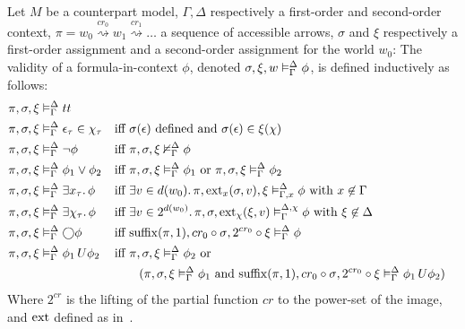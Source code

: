 \begin{definition}
Let $M$ be a counterpart model, $\Gamma,\Delta$ respectively a first-order and second-order context, $\pi = w_0
\overset{cr_0}{\rightsquigarrow} w_1 \overset{cr_1}{\rightsquigarrow} \ldots$ a sequence of accessible arrows,
$\sigma$ and $\xi$ respectively a first-order assignment and a second-order assignment for the world $w_0$:
The validity of a formula-in-context $\phi$, denoted ${\sigma}, {\xi}, {w} \vDash_{\Gamma}^{\Delta} {\phi}$, is defined
inductively as follows:
\begin{align*}
  \pi, \sigma, \xi &\vDash_\Gamma^\Delta tt \\
  \pi, \sigma, \xi &\vDash_\Gamma^\Delta \epsilon_\tau \in \chi_\tau
      &&\text{iff } \sigma(\epsilon) \text{ defined and } \sigma(\epsilon) \in \xi(\chi) \\
  \pi, \sigma, \xi &\vDash_\Gamma^\Delta \neg\phi
      &&\text{iff } {\pi}, {\sigma}, {\xi} \nvDash_{\Gamma}^{\Delta} {\phi} \\
  \pi, \sigma, \xi &\vDash_\Gamma^\Delta \phi_1 \lor \phi_2
      &&\text{iff } {\pi}, {\sigma}, {\xi} \vDash_{\Gamma}^{\Delta} {\phi_1} \text{ or }
      {\pi}, {\sigma}, {\xi} \vDash_{\Gamma}^{\Delta} {\phi_2} \\
  \pi, \sigma, \xi &\vDash_\Gamma^\Delta \exists {x_\tau} \ldotp {\phi}
      &&\text{iff } \exists {v \in d(w_0)} \ldotp {{\pi}, {\operatorname{ext}_{x}({\sigma},{v})}, {\xi} \vDash_{\Gamma, x}^{\Delta} {\phi}} \text{ with }
      x \not\in \Gamma \\
  \pi, \sigma, \xi &\vDash_\Gamma^\Delta \exists {\chi_\tau} \ldotp {\phi}
      &&\text{iff } \exists {v \in 2^{d(w_0)}} \ldotp {{\pi}, {\sigma}, {\operatorname{ext}_{\chi}({\xi},{v})} \vDash_{\Gamma}^{\Delta,\chi} {\phi}}
        \text{ with } \xi \not\in \Delta \\
  \pi, \sigma, \xi &\vDash_\Gamma^\Delta \bigcirc{\phi}
      &&\text{iff } {\operatorname{suffix}(\pi,1)}, {cr_0 \circ \sigma}, {2^{cr_0} \circ \xi} \vDash_{\Gamma}^{\Delta} {\phi} \\
  \pi, \sigma, \xi &\vDash_\Gamma^\Delta {\phi_1}\,U {\phi_2}
     &&\text{iff } {\pi}, {\sigma}, {\xi} \vDash_{\Gamma}^{\Delta} {\phi_2} \text{ or } \\
     &&&\qquad({\pi}, {\sigma}, {\xi} \vDash_{\Gamma}^{\Delta} {\phi_1}
         \text { and } {\operatorname{suffix}(\pi,1)}, {cr_0 \circ \sigma}, {2^{cr_0} \circ \xi} \vDash_{\Gamma}^{\Delta} {{\phi_1}\,U {\phi_2}}) \\
\end{align*}
  Where $2^{cr}$ is the lifting of the partial function $cr$ to the power-set of the image, and $\operatorname{ext}$ defined as
  in~.
\end{definition}

